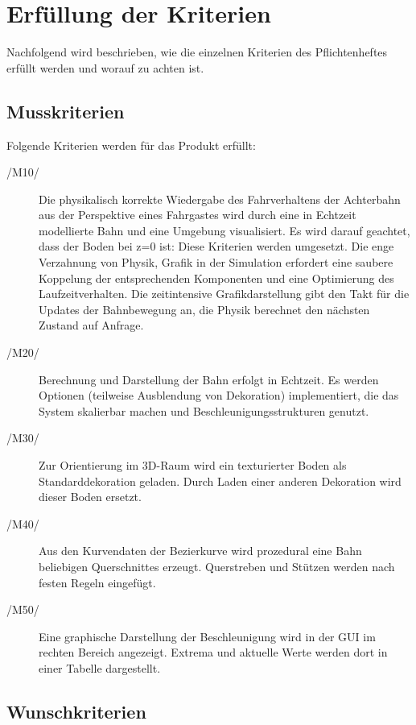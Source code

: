 \chapter{Erfüllung der Kriterien}

Nachfolgend wird beschrieben, wie die einzelnen Kriterien des Pflichtenheftes
erfüllt werden und worauf zu achten ist.
\section{Musskriterien}

Folgende Kriterien werden für das Produkt erfüllt:
\begin{description}
	\item[/M10/] Die physikalisch korrekte Wiedergabe des Fahrverhaltens der Achterbahn aus der Perspektive eines Fahrgastes wird durch eine in Echtzeit modellierte Bahn und eine Umgebung visualisiert. Es wird darauf geachtet, dass der Boden bei z=0 ist: Diese Kriterien werden umgesetzt. Die enge Verzahnung von Physik, Grafik in der Simulation erfordert eine saubere Koppelung der entsprechenden Komponenten und
eine Optimierung des Laufzeitverhalten. Die zeitintensive Grafikdarstellung gibt den Takt für die Updates der Bahnbewegung an, die Physik berechnet den nächsten Zustand auf Anfrage.
	\item[/M20/] Berechnung und Darstellung der Bahn erfolgt in Echtzeit. Es werden Optionen (teilweise Ausblendung von Dekoration) implementiert, die das System skalierbar machen und Beschleunigungsstrukturen genutzt.
	\item[/M30/] Zur Orientierung im 3D-Raum wird ein texturierter Boden als Standarddekoration geladen. Durch Laden einer anderen Dekoration wird dieser Boden ersetzt.
	\item[/M40/] Aus den Kurvendaten der Bezierkurve wird prozedural eine Bahn beliebigen Querschnittes erzeugt. Querstreben und Stützen werden nach festen Regeln eingefügt.
	\item[/M50/] Eine graphische Darstellung der Beschleunigung wird in der GUI im rechten Bereich angezeigt. Extrema und aktuelle Werte werden dort in einer Tabelle dargestellt.
\end{description}

\section{Wunschkriterien}

